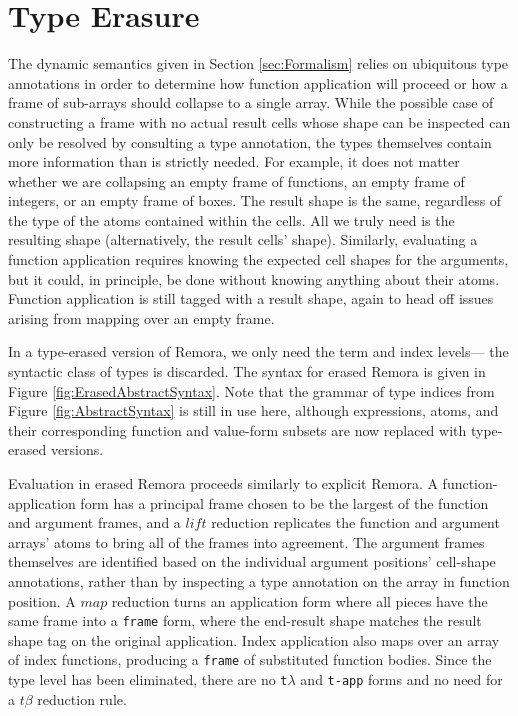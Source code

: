 \section{Type Erasure}
The dynamic semantics given in Section \ref{sec:Formalism}
relies on ubiquitous type annotations
in order to determine how function application will proceed
or how a frame of sub-arrays should collapse to a single array.
While the possible case of constructing a frame
with no actual result cells whose shape can be inspected
can only be resolved by consulting a type annotation,
the types themselves contain more information than is strictly needed.
For example, it does not matter whether we are collapsing
an empty frame of functions,
an empty frame of integers,
or an empty frame of boxes.
The result shape is the same,
regardless of the type of the atoms contained within the cells.
All we truly need is the resulting shape (alternatively, the result cells' shape).
Similarly, evaluating a function application requires knowing
the expected cell shapes for the arguments,
but it could, in principle, be done
without knowing anything about their atoms.
Function application is still tagged with a result shape,
again to head off issues arising from mapping over an empty frame.

In a type-erased version of Remora,
we only need the term and index levels---%
the syntactic class of types is discarded.
The syntax for erased Remora is given in Figure \ref{fig:ErasedAbstractSyntax}.
Note that the grammar of type indices from Figure \ref{fig:AbstractSyntax} is still in use here,
although expressions, atoms, and their corresponding function and value-form subsets
are now replaced with type-erased versions.

\FigErasedAbstractSyntax

Evaluation in erased Remora proceeds similarly to explicit Remora.
A function-application form has a principal frame
chosen to be the largest of the function and argument frames,
and a $\mathit{lift}$ reduction replicates the function and argument arrays' atoms
to bring all of the frames into agreement.
The argument frames themselves are identified based on
the individual argument positions' cell-shape annotations,
rather than by inspecting a type annotation on the array in function position.
A $\mathit{map}$ reduction turns an application form where all pieces have the same frame
into a {\tt frame} form,
where the end-result shape matches the result shape tag on the original application.
Index application also maps over an array of index functions,
producing a {\tt frame} of substituted function bodies.
Since the type level has been eliminated,
there are no {\tt t$\lambda$} and {\tt t-app} forms
and no need for a $t\beta$ reduction rule.

